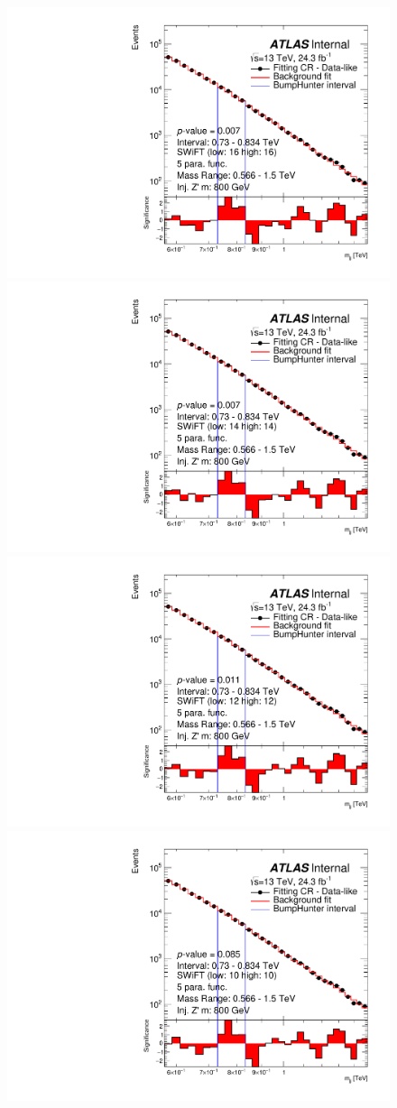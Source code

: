 \begin{figure}[!b]
\captionsetup[subfigure]{aboveskip=0pt,justification=centering}
\centering
{} {
  \includegraphics[width=0.45\linewidth, angle=0]{figs/Dibjet/LowMass/FitStudy_min566/bhFit_corrFitCR_dataLike_5para_low16_high16_inj_Zprimebb800_xsFactor1.pdf}
}
 {
  \includegraphics[width=0.45\linewidth, angle=0]{figs/Dibjet/LowMass/FitStudy_min566/bhFit_corrFitCR_dataLike_5para_low14_high14_inj_Zprimebb800_xsFactor1.pdf}
}\\
 {
  \includegraphics[width=0.45\linewidth, angle=0]{figs/Dibjet/LowMass/FitStudy_min566/bhFit_corrFitCR_dataLike_5para_low12_high12_inj_Zprimebb800_xsFactor1.pdf}
}
 {
  \includegraphics[width=0.45\linewidth, angle=0]{figs/Dibjet/LowMass/FitStudy_min566/bhFit_corrFitCR_dataLike_5para_low10_high10_inj_Zprimebb800_xsFactor1.pdf}
}
\end{figure}
